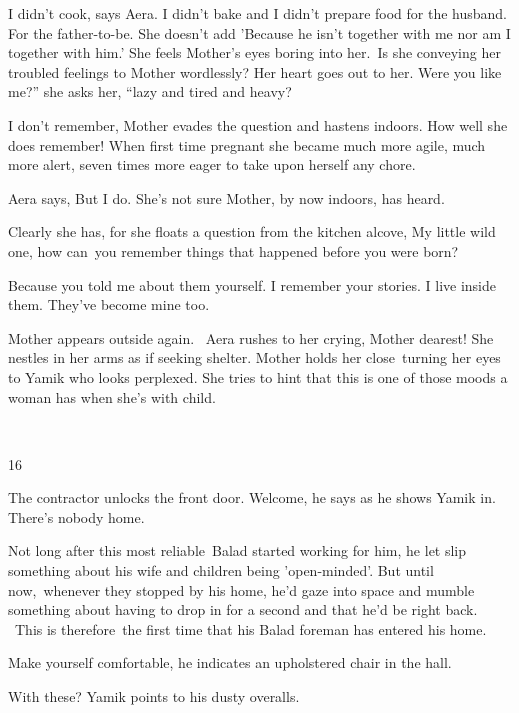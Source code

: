 \documentclass[twoside,11pt]{book}
\begin{document}
{\textquotedbl}I didn't cook,{\textquotedbl} says Aera. {\textquotedbl}I didn't bake and I didn't prepare food for the
husband. For the father-to-be.{\textquotedbl} She doesn't add 'Because he isn't together with me nor am I together with
him.{}' She feels Mother's eyes boring into her.\ Is she conveying her troubled feelings to Mother wordlessly? Her
heart goes out to her. {\textquotedbl}Were you like me?'' she asks her, ``lazy and tired and heavy?{\textquotedbl} 

{\textquotedbl}I don't remember,{\textquotedbl} Mother evades the question and hastens indoors. How well she does
remember! When first time pregnant she became much more agile, much more alert, seven times more eager to take upon
herself any chore.~~~ 

Aera says, {\textquotedbl}But I do.{\textquotedbl} She's not sure Mother, by now indoors, has heard. 

Clearly she has, for she floats a question from the kitchen alcove, {\textquotedbl}My little wild one, how can~you
remember things that happened before you were born?{\textquotedbl} 

{\textquotedbl}Because you told me about them yourself. I remember your stories. I live inside them. They've become mine
too.{\textquotedbl}

Mother appears outside again. ~Aera rushes to her crying, {\textquotedbl}Mother dearest!{\textquotedbl} She nestles in
her arms as if seeking shelter. Mother holds her close~turning her eyes to Yamik who looks perplexed. She tries to hint
that this is one of those moods a woman has when she's with child. 

~

16 

The contractor unlocks the front door. {\textquotedbl}Welcome,{\textquotedbl} he says as he shows Yamik in.
{\textquotedbl}There's nobody home.{\textquotedbl} 

Not long after this most reliable\ Balad started working for him, he let slip something about his wife and children
being {}'open-minded{}'. But until now,~whenever they stopped by his home, he'd gaze into space and mumble something
about having to drop in for a second and that he'd be right back. ~This is therefore~the first time that his Balad
foreman has entered his home.

{\textquotedbl}Make yourself comfortable,{\textquotedbl} he indicates an upholstered chair in the hall.~ 

{\textquotedbl}With these?{\textquotedbl} Yamik points to his dusty overalls. 
\end{document}
